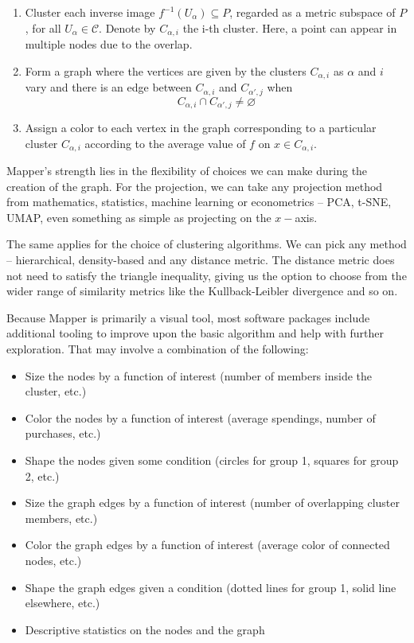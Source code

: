 \begin{enumerate}
  \item Cluster each inverse image $f^{-1}(U_{\alpha}) \subseteq P$, regarded as a metric subspace of $P$, for all $U_{\alpha} \in \mathcal{C}$. Denote by $C_{\alpha, i}$ the i-th cluster. Here, a point can appear in multiple nodes due to the overlap.

  \item Form a graph where the vertices are given by the clusters $C_{\alpha, i}$ as $\alpha$ and $i$ vary and there is an edge between $C_{\alpha, i}$ and $C_{\alpha', j}$ when
        \begin{equation*}
          C_{\alpha, i} \cap C_{\alpha', j} \neq \varnothing
        \end{equation*}

  \item Assign a color to each vertex in the graph corresponding to a particular cluster $C_{\alpha, i}$ according to the average value of $f$ on $x \in C_{\alpha, i}$.
\end{enumerate}

Mapper's strength lies in the flexibility of choices we can make during the creation of the graph. For the projection, we can take any projection method from mathematics, statistics, machine learning or  econometrics -- PCA, t-SNE, UMAP, even something as simple as projecting on the $x-$axis.

The same applies for the choice of clustering algorithms. We can pick any method -- hierarchical, density-based and any distance metric. The distance metric does not need to satisfy the triangle inequality, giving us the option to choose from the wider range of similarity metrics like the Kullback-Leibler divergence and so on.

Because Mapper is primarily a visual tool, most software packages include additional tooling to improve upon the basic algorithm and help with further exploration. That may involve a combination of the following:

\begin{itemize}
  \item Size the nodes by a function of interest (number of members inside the cluster, etc.)
  \item Color the nodes by a function of interest (average spendings, number of purchases, etc.)
  \item Shape the nodes given some condition (circles for group 1, squares for group 2, etc.)
  \item Size the graph edges by a function of interest (number of overlapping cluster members, etc.)
  \item Color the graph edges by a function of interest (average color of connected nodes, etc.)
  \item Shape the graph edges given a condition (dotted lines for group 1, solid line elsewhere, etc.)
  \item Descriptive statistics on the nodes and the graph
\end{itemize}

